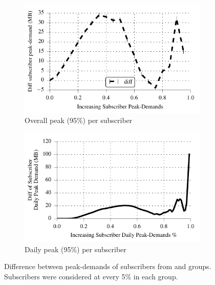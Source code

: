  
\begin{figure}[t]
\begin{minipage}{1\linewidth}
\centering
%
\begin{subfigure}[b]{.99\linewidth}
\includegraphics[width=\linewidth]{figures/diff_perc95_bytes_subsc-overall.pdf}
               \caption{Overall peak (95\%) per subscriber\label{fig:diff-peak-overall}}
\end{subfigure}
% 
\begin{subfigure}[b]{.99\linewidth}
\includegraphics[width=\linewidth]{figures/diff_perc95_bytes_subsc-daily-overall.pdf}
                \caption{Daily peak (95\%) per subscriber\label{fig:diff-peak-daily}}
\end{subfigure}
%
\end{minipage}
  \caption{Difference between peak-demands of subscribers from \treatment{} and
  \control{} groups. Subscribers were considered at every 5\% in each group.
  \label{fig:diff-peak}}
\end{figure}


